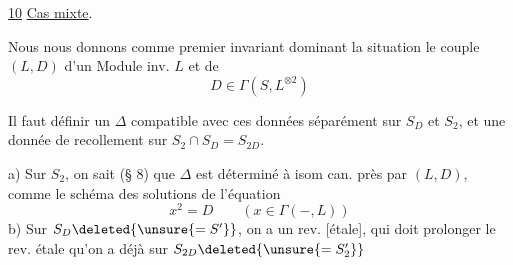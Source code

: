 \uline{10} \uline{Cas mixte}. 


Nous nous donnons comme premier invariant dominant la situation le couple $(L,D)$ d'un Module inv. $L$ et de
\[D\in\Gamma(S,L^{\otimes2})\tag*{(103)}\]

Il faut définir un $\Delta$ compatible avec ces données séparément sur $S_D$ et $S_2$, et  une donnée de recollement sur $S_2\cap S_D=S_{2D}$.

a) Sur $S_2$, on sait (§ 8) que $\Delta$ est déterminé à isom can. près par $(L,D)$, comme le schéma des solutions de l'équation
\[x^2=D\qquad(x\in\Gamma(-,L))\tag*{(104)}\]
b) Sur $S_D\deleted{\unsure{=S'}}$, on a un rev. [étale], qui doit prolonger le rev. étale qu'on a déjà sur $S_{2D}\deleted{\unsure{=S'_2}}$

